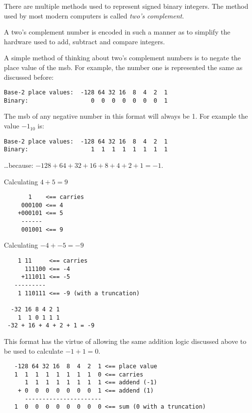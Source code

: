 There are multiple methods used to represent signed binary integers.
The method used by most modern computers is called {\em two's complement}.

A two's complement number is encoded in such a manner as to simplify
the hardware used to add, subtract and compare integers.  

A simple method of thinking about two's complement numbers is to
negate the place value of the \acrshort{msb}.  For example, the 
number one is represented the same as discussed before:

\begin{verbatim}
Base-2 place values:  -128 64 32 16  8  4  2  1
Binary:                  0  0  0  0  0  0  0  1
\end{verbatim}

The \acrshort{msb} of any negative number in this format will always
be 1.  For example the value $-1_{10}$ is:

\begin{verbatim}
Base-2 place values:  -128 64 32 16  8  4  2  1
Binary:                  1  1  1  1  1  1  1  1
\end{verbatim}

\ldots because: $-128+64+32+16+8+4+2+1=-1$.


Calculating $4+5 = 9$

\begin{verbatim}
	   1    <== carries
	 000100 <== 4
	+000101 <== 5
     ------
	 001001 <== 9
\end{verbatim}

Calculating $-4+ -5 = -9$

\begin{verbatim}
	1 11     <== carries
	  111100 <== -4
	 +111011 <== -5
   ---------
	1 110111 <== -9 (with a truncation)

  -32 16 8 4 2 1
    1  1 0 1 1 1
 -32 + 16 + 4 + 2 + 1 = -9
\end{verbatim}


This format has the virtue of allowing the same addition logic 
discussed above to be used to calculate $-1+1=0$.

\begin{verbatim}
   -128 64 32 16  8  4  2  1 <== place value
   1  1  1  1  1  1  1  1  0 <== carries
      1  1  1  1  1  1  1  1 <== addend (-1)
    + 0  0  0  0  0  0  0  1 <== addend (1)
      ----------------------
   1  0  0  0  0  0  0  0  0 <== sum (0 with a truncation)
\end{verbatim}

